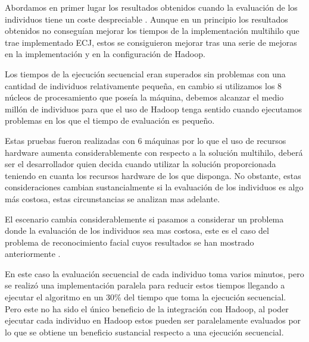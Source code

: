 Abordamos en primer lugar los resultados obtenidos cuando la evaluaci\'on de los individuos tiene un coste despreciable . Aunque en un principio los resultados obtenidos no consegu\'ian mejorar los tiempos de la implementaci\'on multihilo que trae implementado ECJ, estos se consiguieron mejorar tras una serie de mejoras en la implementaci\'on y en la configuraci\'on de Hadoop.

Los tiempos de la ejecuci\'on secuencial eran superados sin problemas con una cantidad de individuos relativamente peque\~na, en cambio si utilizamos los 8 núcleos de procesamiento que poseía la m\'aquina, debemos alcanzar el medio mill\'on de individuos para que el uso de Hadoop tenga sentido cuando ejecutamos problemas en los que el tiempo de evaluaci\'on es peque\~no. 

Estas pruebas fueron realizadas con 6 m\'aquinas por lo que el uso de recursos hardware aumenta considerablemente con respecto a la soluci\'on multihilo, deber\'a ser el desarrollador quien decida cuando utilizar la soluci\'on proporcionada teniendo en cuanta los recursos hardware de los que disponga. No obstante, estas consideraciones cambian sustancialmente si la evaluaci\'on de los individuos es algo m\'as costosa, estas circunstancias se analizan mas adelante.


El escenario cambia considerablemente si pasamos a considerar un problema donde la evaluaci\'on de los individuos sea mas costosa, este es el caso del problema de reconocimiento facial cuyos resultados se han mostrado anteriormente . 

En este caso la evaluaci\'on secuencial de cada individuo toma varios minutos, pero se realiz\'o una implementaci\'on paralela para reducir estos tiempos llegando a ejecutar el algoritmo en un 30\% del tiempo que toma la ejecuci\'on secuencial. Pero este no ha sido el \'unico beneficio de la integraci\'on con Hadoop, al poder ejecutar cada individuo en Hadoop estos pueden ser paralelamente evaluados por lo que se obtiene un beneficio sustancial respecto a una ejecuci\'on secuencial. 

